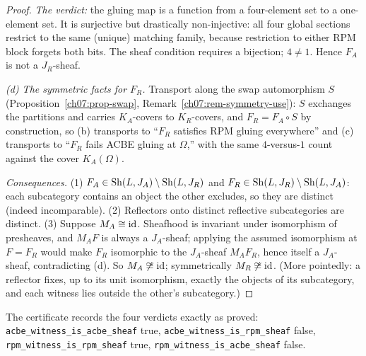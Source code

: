 \begin{proof}
\emph{The verdict:} the gluing map is a function from a four-element set to a one-element set. It is surjective but drastically non-injective: all four global sections restrict to the same (unique) matching family, because restriction to either RPM block forgets both bits. The sheaf condition requires a bijection; $4\neq 1$. Hence $F_{A}$ is not a $J_{R}$-sheaf.

\emph{(d) The symmetric facts for $F_{R}$.} Transport along the swap automorphism $S$ (Proposition~\ref{ch07:prop-swap}, Remark~\ref{ch07:rem-symmetry-use}): $S$ exchanges the partitions and carries $K_{A}$-covers to $K_{R}$-covers, and $F_{R}=F_{A}\circ S$ by construction, so (b) transports to ``$F_{R}$ satisfies RPM gluing everywhere'' and (c) transports to ``$F_{R}$ fails ACBE gluing at $\Omega$,'' with the same $4$-versus-$1$ count against the cover $K_{A}(\Omega)$.

\emph{Consequences.} (1) $F_{A}\in\mathrm{Sh}(L,J_{A})\setminus\mathrm{Sh}(L,J_{R})$ and $F_{R}\in\mathrm{Sh}(L,J_{R})\setminus\mathrm{Sh}(L,J_{A})$: each subcategory contains an object the other excludes, so they are distinct (indeed incomparable). (2) Reflectors onto distinct reflective subcategories are distinct. (3) Suppose $M_{A}\cong\mathrm{id}$. Sheafhood is invariant under isomorphism of presheaves, and $M_{A}F$ is always a $J_{A}$-sheaf; applying the assumed isomorphism at $F=F_{R}$ would make $F_{R}$ isomorphic to the $J_{A}$-sheaf $M_{A}F_{R}$, hence itself a $J_{A}$-sheaf, contradicting (d). So $M_{A}\not\cong\mathrm{id}$; symmetrically $M_{R}\not\cong\mathrm{id}$. (More pointedly: a reflector fixes, up to its unit isomorphism, exactly the objects of its subcategory, and each witness lies outside the other's subcategory.)
\end{proof}

The certificate records the four verdicts exactly as proved: \texttt{acbe\_witness\_is\_acbe\_sheaf} true, \texttt{acbe\_witness\_is\_rpm\_sheaf} false, \texttt{rpm\_witness\_is\_rpm\_sheaf} true, \texttt{rpm\_witness\_is\_acbe\_sheaf} false.

